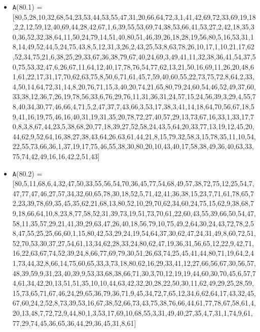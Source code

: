 \documentclass[runningheads,a4paper]{llncs}
\begin{document}
\begin{itemize}
	\item {\texttt A(80.1) = } [80,5,28,10,32,68,54,23,53,44,53,55,47,31,20,66,64,72,3,1,41,42,69,72,33,69,19,18,2,2,12,59,12,40,69,44,28,42,67,1,6,39,55,53,69,74,38,53,66,41,53,27,2,42,18,35,30,36,52,32,38,64,11,50,24,79,14,51,40,80,51,46,39,26,18,28,19,56,80,5,16,53,31,18,14,49,52,44,5,24,75,43,8,5,12,31,3,26,2,43,25,53,8,63,78,26,10,17,1,10,21,17,62,52,34,75,21,6,38,25,29,33,67,36,38,79,67,40,24,69,3,49,41,11,32,38,36,41,54,37,50,75,53,32,47,6,26,67,11,64,12,40,17,78,76,54,77,62,13,21,50,16,69,11,26,20,48,61,61,22,17,31,17,70,62,63,75,8,50,6,71,61,45,7,59,40,60,55,22,73,75,72,8,64,2,33,4,50,14,64,72,31,14,8,20,76,71,15,3,40,20,74,21,65,80,79,24,60,54,46,52,49,37,60,33,38,12,36,7,26,19,78,56,33,6,76,29,76,11,31,36,31,24,57,15,24,56,39,3,29,4,55,78,40,34,30,77,46,66,4,71,5,2,47,37,7,43,66,3,53,17,38,3,41,14,18,64,70,56,67,18,59,41,16,19,75,46,16,40,31,19,31,35,20,78,72,27,40,57,29,13,73,67,16,33,1,33,17,70,8,3,8,67,44,23,5,38,68,20,77,18,39,27,52,58,24,43,5,64,20,33,77,13,19,12,45,20,44,62,9,52,64,16,38,27,38,43,64,26,63,61,44,21,8,15,79,32,58,3,15,78,35,11,10,54,22,55,73,66,36,1,37,19,17,75,46,55,38,30,80,20,10,43,40,17,58,38,49,36,40,63,33,75,74,42,49,16,16,42,2,51,43]
	\item {\texttt A(80.2) = } [80,5,11,68,6,4,32,47,50,33,55,56,54,70,36,45,77,54,68,49,57,38,72,75,12,25,54,7,47,77,47,46,27,57,34,32,60,65,78,30,18,52,5,71,42,41,36,38,15,23,7,71,61,78,65,72,23,39,78,69,35,45,35,62,21,68,13,80,52,10,29,70,62,34,60,24,75,15,62,9,38,68,79,18,66,64,10,8,23,8,77,58,52,31,39,73,19,51,73,70,61,22,60,43,55,39,66,50,54,47,58,11,35,57,29,21,41,39,29,63,47,26,40,18,56,79,10,75,49,2,64,30,24,43,72,78,2,58,47,55,25,25,66,60,1,15,80,42,53,29,24,19,54,64,37,30,62,47,24,31,49,8,60,72,51,52,70,53,30,37,27,54,61,13,34,62,28,33,24,80,62,47,19,36,31,56,65,12,22,9,42,71,16,22,63,67,74,52,39,24,8,66,77,69,79,30,51,26,63,74,25,45,41,44,80,71,19,64,2,41,73,44,32,8,66,14,75,60,65,33,3,73,18,80,62,16,29,33,41,12,27,66,56,67,30,56,57,48,39,59,9,31,23,40,39,9,53,33,68,38,66,71,30,3,70,12,19,19,44,60,30,70,45,6,57,74,61,34,42,20,13,51,51,35,10,10,44,63,42,32,20,28,22,50,30,11,62,49,29,25,28,59,15,73,65,71,67,46,24,29,65,36,79,36,71,9,45,34,72,7,65,12,34,6,62,64,17,43,32,45,67,60,24,2,52,8,73,39,53,16,67,38,52,66,73,43,75,38,76,66,44,61,77,78,67,58,61,4,20,13,48,7,72,72,9,44,80,1,3,53,17,69,10,68,55,3,31,49,40,27,35,4,7,31,1,74,9,61,77,29,74,45,36,65,36,44,29,36,45,31,8,61]

\end{itemize}
\end{document}
